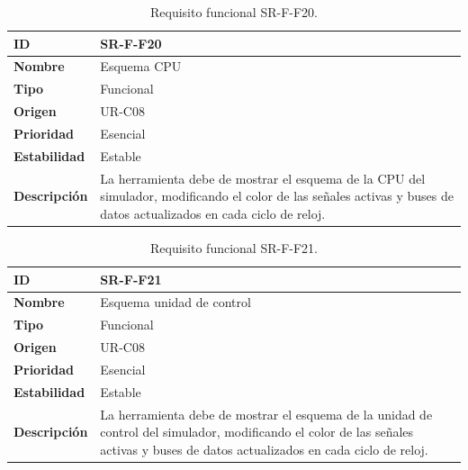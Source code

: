 \begin{center}
\begin{table}[htbp]
\centering
\caption{Requisito funcional SR-F-F20.}
\begin{tabular}{@{}p{2.5cm} p{9cm}@{}} 
\toprule
\textbf{ID} 				& SR-F-F20 \\
\midrule
\textbf{Nombre} 			& Esquema CPU\\
\midrule
\textbf{Tipo} 			& Funcional \\
\midrule
\textbf{Origen} 			& UR-C08 \\
\midrule
\textbf{Prioridad}		& Esencial \\
\midrule
\textbf{Estabilidad} 		& Estable \\
\midrule
\textbf{Descripción} 	& La herramienta debe de mostrar el esquema de la CPU del simulador, modificando el color de las señales activas y buses de datos actualizados en cada ciclo de reloj. \\
\bottomrule
\end{tabular}
\label{tab:srff20}
\end{table}
\end{center}

\begin{center}
\begin{table}[htbp]
\centering
\caption{Requisito funcional SR-F-F21.}
\begin{tabular}{@{}p{2.5cm} p{9cm}@{}} 
\toprule
\textbf{ID} 				& SR-F-F21 \\
\midrule
\textbf{Nombre} 			& Esquema unidad de control\\
\midrule
\textbf{Tipo} 			& Funcional \\
\midrule
\textbf{Origen} 			& UR-C08 \\
\midrule
\textbf{Prioridad}		& Esencial \\
\midrule
\textbf{Estabilidad} 		& Estable \\
\midrule
\textbf{Descripción} 	& La herramienta debe de mostrar el esquema de la unidad de control del simulador, modificando el color de las señales activas y buses de datos actualizados en cada ciclo de reloj. \\
\bottomrule
\end{tabular}
\label{tab:srff21}
\end{table}
\end{center}

